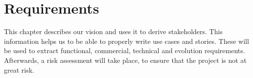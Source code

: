 \chapter{Requirements}
\label{ch:requirements}
This chapter describes our vision and uses it to derive stakeholders. This information helps us to be able to properly write use cases and stories. These will be used to extract functional, commercial, technical and evolution requirements. Afterwards, a risk assessment will take place, to ensure that the project is not at great risk.

















